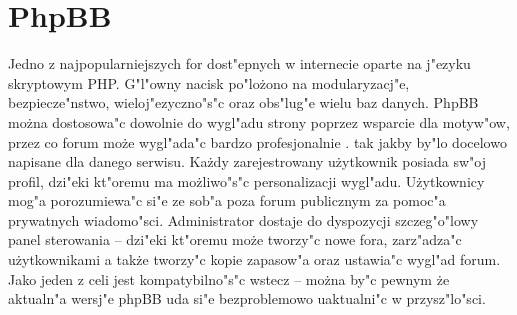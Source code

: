 \documentclass[12pt,a4paper,twoside]{article}
\begin{document}
\section{PhpBB}
Jedno z najpopularniejszych for dost"epnych w internecie oparte na j"ezyku skryptowym PHP. G"l"owny nacisk po"lo\.zono na modularyzacj"e, bezpiecze"nstwo, wieloj"ezyczno"s"c oraz obs"lug"e wielu baz danych. PhpBB mo\.zna dostosowa"c dowolnie do wygl"adu strony poprzez wsparcie dla motyw"ow, przez co forum mo\.ze wygl"ada"c bardzo profesjonalnie . tak jakby by"lo docelowo napisane dla danego serwisu. Ka\.zdy zarejestrowany u\.zytkownik posiada sw"oj profil, dzi"eki kt"oremu ma mo\.zliwo"s"c personalizacji wygl"adu. U\.zytkownicy mog"a porozumiewa"c si"e ze sob"a poza forum publicznym za pomoc"a prywatnych wiadomo"sci. Administrator dostaje do dyspozycji szczeg"o"lowy panel sterowania -- dzi"eki kt"oremu mo\.ze tworzy"c nowe fora, zarz"adza"c u\.zytkownikami a tak\.ze tworzy"c kopie zapasow"a oraz ustawia"c wygl"ad forum.\\
Jako jeden z celi jest kompatybilno"s"c wstecz -- mo\.zna by"c pewnym \.ze aktualn"a wersj"e phpBB uda si"e bezproblemowo uaktualni"c w przysz"lo"sci.  
	
\end{document}
